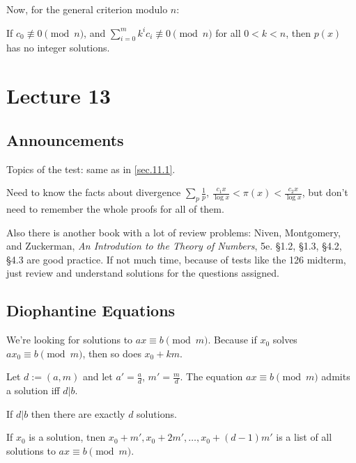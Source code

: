 \documentclass{article}
\begin{document}
Now, for the general criterion modulo $n$:

\begin{theorem}
	If $c_0 \not \equiv 0 \pmod n$, and $\sum_{i = 0}^m k^i c_i \not \equiv 0 \pmod n$ for all $0 < k < n$, then $p(x)$ has no integer solutions.
\end{theorem}

\section{Lecture 13}
\subsection{Announcements}
Topics of the test: same as in \ref{sec.11.1}.

Need to know the facts about divergence $\sum_{p} \frac{1}{p}$, $\frac{c_1x}{\log x} < \pi(x) < \frac{c_2x}{\log x}$, but don't need to remember the whole proofs for all of them.

Also there is another book with a lot of review problems: Niven, Montgomery, and Zuckerman, \textit{An Introdution to the Theory of Numbers}, 5e. §1.2, §1.3, §4.2, §4.3 are good practice. If not much time, because of tests like the 126 midterm, just review and understand solutions for the questions assigned. 

\subsection{Diophantine Equations}
We're looking for solutions to $ax \equiv b \pmod m$. Because if $x_0$ solves $ax_0 \equiv b \pmod m$, then so does $x_0 + km$.

\begin{lemma}
	Let $d := (a, m)$ and let $a' = \frac{a}{d}$, $m' = \frac{m}{d}$.
	The equation $ax \equiv b \pmod m$ admits a solution iff $d | b$. 

	If $d|b$ then there are exactly $d$ solutions.

	If $x_0$ is a solution, tnen $x_0 + m', x_0 + 2m', \ldots, x_0 + (d-1)m'$ is a list of all solutions to $ax \equiv b \pmod m$.
\end{lemma}
\end{document}
